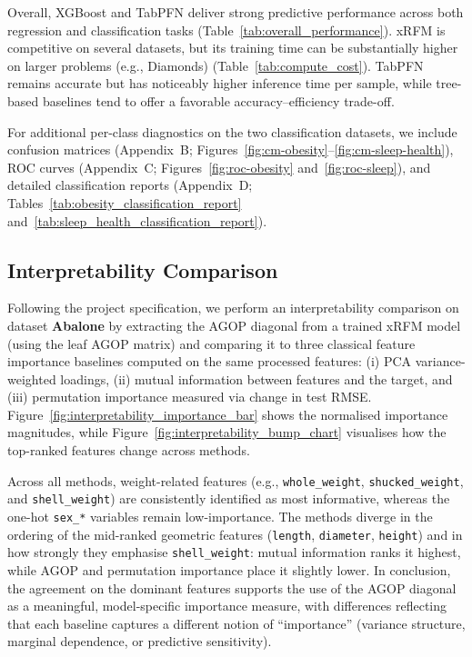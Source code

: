 Overall, XGBoost and TabPFN deliver strong predictive performance across both regression and classification tasks (Table~\ref{tab:overall_performance}). xRFM is competitive on several datasets, but its training time can be substantially higher on larger problems (e.g., Diamonds) (Table~\ref{tab:compute_cost}). TabPFN remains accurate but has noticeably higher inference time per sample, while tree-based baselines tend to offer a favorable accuracy--efficiency trade-off.

For additional per-class diagnostics on the two classification datasets, we include confusion matrices (Appendix~B; Figures~\ref{fig:cm-obesity}--\ref{fig:cm-sleep-health}), ROC curves (Appendix~C; Figures~\ref{fig:roc-obesity} and~\ref{fig:roc-sleep}), and detailed classification reports (Appendix~D; Tables~\ref{tab:obesity_classification_report} and~\ref{tab:sleep_health_classification_report}).

\subsection{Interpretability Comparison}
Following the project specification, we perform an interpretability comparison on dataset \textbf{Abalone} by extracting the AGOP diagonal from a trained xRFM model (using the leaf AGOP matrix) and comparing it to three classical feature importance baselines computed on the same processed features: (i) PCA variance-weighted loadings, (ii) mutual information between features and the target, and (iii) permutation importance measured via change in test RMSE. Figure~\ref{fig:interpretability_importance_bar} shows the normalised importance magnitudes, while Figure~\ref{fig:interpretability_bump_chart} visualises how the top-ranked features change across methods.

Across all methods, weight-related features (e.g., \texttt{whole\_weight}, \texttt{shucked\_weight}, and \texttt{shell\_weight}) are consistently identified as most informative, whereas the one-hot \texttt{sex\_*} variables remain low-importance. The methods diverge in the ordering of the mid-ranked geometric features (\texttt{length}, \texttt{diameter}, \texttt{height}) and in how strongly they emphasise \texttt{shell\_weight}: mutual information ranks it highest, while AGOP and permutation importance place it slightly lower. In conclusion, the agreement on the dominant features supports the use of the AGOP diagonal as a meaningful, model-specific importance measure, with differences reflecting that each baseline captures a different notion of ``importance'' (variance structure, marginal dependence, or predictive sensitivity).

